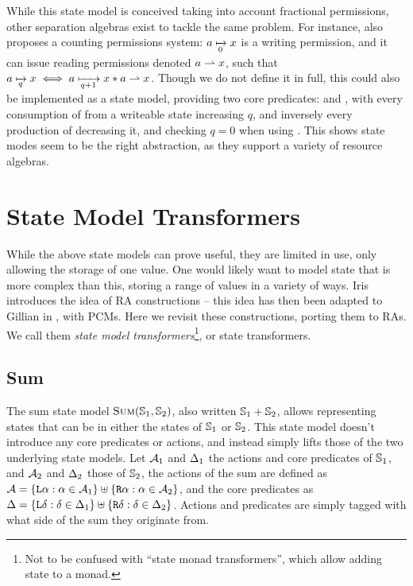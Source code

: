 While this state model is conceived taking into account fractional permissions, other separation algebras exist to tackle the same problem. For instance, \cite{fracpermissions} also proposes a counting permissions system: $a\mapstoq{0}x$ is a writing permission, and it can issue reading permissions denoted $a\rightharpoonup x$, such that $a\mapstoq{q}x \iff a\mapstoq{q+1}x * a\part x$. Though we do not define it in full, this could also be implemented as a state model, providing two core predicates:  and , with every consumption of  from a writeable state increasing $q$, and inversely every production of  decreasing it, and checking $q=0$ when using \store. This shows state modes seem to be the right abstraction, as they support a variety of resource algebras.

\section{State Model Transformers} \label{sec:theory-state-model-transf}

While the above state models can prove useful, they are limited in use, only allowing the storage of one value. One would likely want to model state that is more complex than this, storing a range of values in a variety of ways. Iris introduces the idea of RA constructions \cite{iris} -- this idea has then been adapted to Gillian in \cite{sacha-phd}, with PCMs. Here we revisit these constructions, porting them to RAs. We call them \emph{state model transformers}\footnote{Not to be confused with ``state monad transformers'', which allow adding state to a monad.}, or state transformers.

\subsection{Sum}

The sum state model $\textsc{Sum}(\mathbb S_1,\mathbb S_2)$, also written $\mathbb S_1 + \mathbb S_2$, allows representing states that can be in either the states of $\mathbb S_1$ or $\mathbb S_2$. This state model doesn't introduce any core predicates or actions, and instead simply lifts those of the two underlying state models. Let ${\cal{A}}_1$ and $\Delta_1$ the actions and core predicates of $\mathbb S_1$, and ${\cal{A}}_2$ and $\Delta_2$ those of $\mathbb S_2$, the actions of the sum are defined as ${{\cal{A}} = \{\texttt{L}\alpha : \alpha \in {\ensuremath{\cal{A}}}_1 \} \uplus \{\texttt{R}\alpha : \alpha \in {\ensuremath{\cal{A}}}_2 \}}$, and the core predicates as ${\Delta = \{\texttt{L}\delta : \delta \in \Delta_1 \} \uplus \{\texttt{R}\delta : \delta \in \Delta_2 \}}$. Actions and predicates are simply tagged with what side of the sum they originate from.

